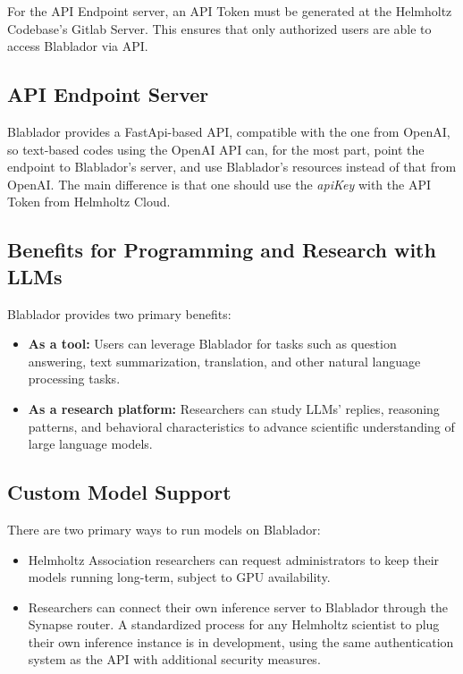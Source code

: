 \documentclass[10pt,conference]{IEEEtran}
\begin{document}
For the API Endpoint server, an API Token must be generated at the Helmholtz Codebase's Gitlab Server\cite{helmholtzcodebase}. This ensures that only authorized users are able to access Blablador via API.

\subsection{API Endpoint Server}
Blablador provides a FastApi-based \cite{FastAPI} API, compatible with the one from OpenAI, so text-based codes using the OpenAI API can, for the most part, point the endpoint to Blablador's server, and use Blablador's resources instead of that from OpenAI. The main difference is that one should use the \emph{apiKey} with the API Token from Helmholtz Cloud.

\subsection{Benefits for Programming and Research with LLMs}
Blablador provides two primary benefits:
\begin{itemize}
    \item \textbf{As a tool:} Users can leverage Blablador for tasks such as question answering, text summarization, translation, and other natural language processing tasks.
    \item \textbf{As a research platform:} Researchers can study LLMs' replies, reasoning patterns, and behavioral characteristics to advance scientific understanding of large language models.
\end{itemize}


\subsection{Custom Model Support}
There are two primary ways to run models on Blablador:
\begin{itemize}
    \item Helmholtz Association researchers can request administrators to keep their models running long-term, subject to GPU availability.
    \item Researchers can connect their own inference server to Blablador through the Synapse router. A standardized process for any Helmholtz scientist to plug their own inference instance is in development, using the same authentication system as the API with additional security measures.
\end{itemize}
\end{document}
